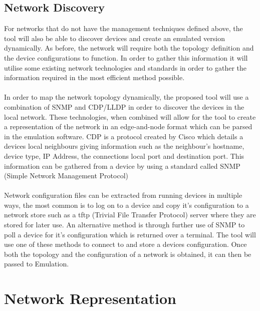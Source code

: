\documentclass[11pt]{report}
\begin{document}
\subsection{Network Discovery}

For networks that do not have the management techniques defined above, the tool will also be able to discover devices and create an emulated version dynamically. As before, the network will require both the topology definition and the device configurations to function. In order to gather this information it will utilise some existing network technologies and standards in order to gather the information required in the most efficient method possible.
\\
\\
In order to map the network topology dynamically, the proposed tool will use a combination of SNMP and CDP/LLDP in order to discover the devices in the local network. These technologies, when combined will allow for the tool to create a representation of the network in an edge-and-node format which can be parsed in the emulation software. CDP is a protocol created by Cisco which details a devices local neighbours giving information such as the neighbour's hostname, device type, IP Address, the connections local port and destination port. This information can be gathered from a device by using a standard called SNMP (Simple Network Management Protocol)
\\
\\
Network configuration files can be extracted from running devices in multiple ways, the most common is to log on to a device and copy it's configuration to a network store such as a tftp (Trivial File Transfer Protocol) server where they are stored for later use. An alternative method is through further use of SNMP to poll a device for it's configuration which is returned over a terminal. The tool will use one of these methods to connect to and store a devices configuration. Once both the topology and the configuration of a network is obtained, it can then be passed to Emulation.

\section{Network Representation}
\end{document}
